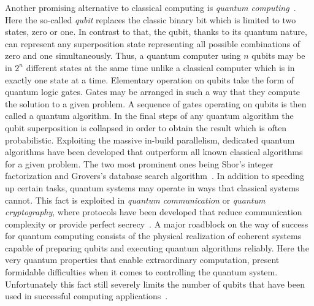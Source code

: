 		Another promising alternative to classical computing is \emph{quantum computing}~\cite{Nielsen:2011:QCQ:1972505}. Here the so-called \emph{qubit} replaces the classic binary bit which is limited to two states, zero or one. In contrast to that, the qubit, thanks to its quantum nature, can represent any superposition state representing all possible combinations of zero and one simultaneously. Thus, a quantum computer using $n$ qubits may be in $2^n$ different states at the same time unlike a classical computer which is in exactly one state at a time. Elementary operation on qubits take the form of quantum logic gates. Gates may be arranged in such a way that they compute the solution to a given problem. A sequence of gates operating on qubits is then called a quantum algorithm. In the final steps of any quantum algorithm the qubit superposition is collapsed in order to obtain the result which is often probabilistic. Exploiting the massive in-build parallelism, dedicated quantum algorithms have been developed that outperform all known classical algorithms for a given problem. The two most prominent ones being Shor's integer factorization and Grovers's database search algorithm~\cite{shor1999polynomial,grover1996fast}. In addition to speeding up certain tasks, quantum systems may operate in ways that classical systems cannot. This fact is exploited in \emph{quantum communication} or \emph{quantum cryptography}, where protocols have been developed that reduce communication complexity or provide perfect secrecy~\cite{de2007fundamentals}. A major roadblock on the way of success for quantum computing consists of the physical realization of coherent systems capable of preparing qubits and executing quantum algorithms reliably. Here the very quantum properties that enable extraordinary computation, present formidable difficulties when it comes to controlling the quantum system. Unfortunately this fact still severely limits the number of qubits that have been used in successful computing applications~\cite{Nielsen:2011:QCQ:1972505}. 

		\FloatBarrier
